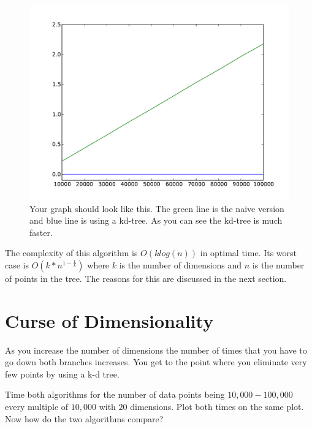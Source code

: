 \begin{figure}[H]
\includegraphics[scale = .5]{4dTime.pdf}
\caption{Your graph should look like this.
The green line is the naive version and blue line is using a kd-tree.
As you can see the kd-tree is much faster.}
\end{figure}

The complexity of this algorithm is $O(klog(n))$ in optimal time.
Its worst case is $O(k*n^{1-\frac{1}{k}})$ where $k$ is the number of dimensions and $n$ is the number of points in the tree.
The reasons for this are discussed in the next section.

\section*{Curse of Dimensionality}

As you increase the number of dimensions the number of times that you have to go down both branches increases.
You get to the point where you eliminate very few points by using a k-d tree.

\begin{problem}
Time both algorithms for the number of data points being $10,000-100,000$ every multiple of $10,000$ with $20$ dimensions.
Plot both times on the same plot. Now how do the two algorithms compare?
\end{problem}

